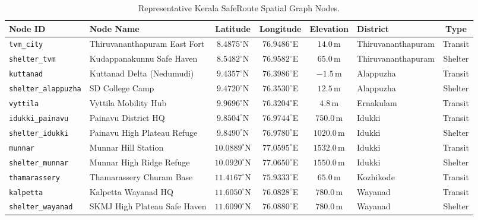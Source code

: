 \documentclass[12pt,oneside]{report}
\begin{document}
\begin{table}[H]
\centering
\scriptsize
\caption{Representative Kerala SafeRoute Spatial Graph Nodes.}
\label{tab:nodes_sample}
\vspace{0.05in}
\begin{tabularx}{\textwidth}{lp{3.5cm}ccclc}
\toprule
\textbf{Node ID} & \textbf{Node Name} & \textbf{Latitude} & \textbf{Longitude} & \textbf{Elevation} & \textbf{District} & \textbf{Type} \\
\midrule
\texttt{tvm\_city} & Thiruvananthapuram East Fort & $8.4875^{\circ}$N & $76.9486^{\circ}$E & $14.0$\,m & Thiruvananthapuram & Transit \\
\texttt{shelter\_tvm} & Kudappanakunnu Safe Haven & $8.5482^{\circ}$N & $76.9582^{\circ}$E & $65.0$\,m & Thiruvananthapuram & Shelter \\
\texttt{kuttanad} & Kuttanad Delta (Nedumudi) & $9.4357^{\circ}$N & $76.3986^{\circ}$E & $-1.5$\,m & Alappuzha & Transit \\
\texttt{shelter\_alappuzha} & SD College Camp & $9.4720^{\circ}$N & $76.3530^{\circ}$E & $12.5$\,m & Alappuzha & Shelter \\
\texttt{vyttila} & Vyttila Mobility Hub & $9.9696^{\circ}$N & $76.3204^{\circ}$E & $4.8$\,m & Ernakulam & Transit \\
\texttt{idukki\_painavu} & Painavu District HQ & $9.8504^{\circ}$N & $76.9744^{\circ}$E & $750.0$\,m & Idukki & Transit \\
\texttt{shelter\_idukki} & Painavu High Plateau Refuge & $9.8490^{\circ}$N & $76.9780^{\circ}$E & $1020.0$\,m & Idukki & Shelter \\
\texttt{munnar} & Munnar Hill Station & $10.0889^{\circ}$N & $77.0595^{\circ}$E & $1532.0$\,m & Idukki & Transit \\
\texttt{shelter\_munnar} & Munnar High Ridge Refuge & $10.0920^{\circ}$N & $77.0650^{\circ}$E & $1550.0$\,m & Idukki & Shelter \\
\texttt{thamarassery} & Thamarassery Churam Base & $11.4167^{\circ}$N & $75.9333^{\circ}$E & $65.0$\,m & Kozhikode & Transit \\
\texttt{kalpetta} & Kalpetta Wayanad HQ & $11.6050^{\circ}$N & $76.0828^{\circ}$E & $780.0$\,m & Wayanad & Transit \\
\texttt{shelter\_wayanad} & SKMJ High Plateau Safe Haven & $11.6090^{\circ}$N & $76.0880^{\circ}$E & $780.0$\,m & Wayanad & Shelter \\
\bottomrule
\end{tabularx}
\end{table}
\end{document}
